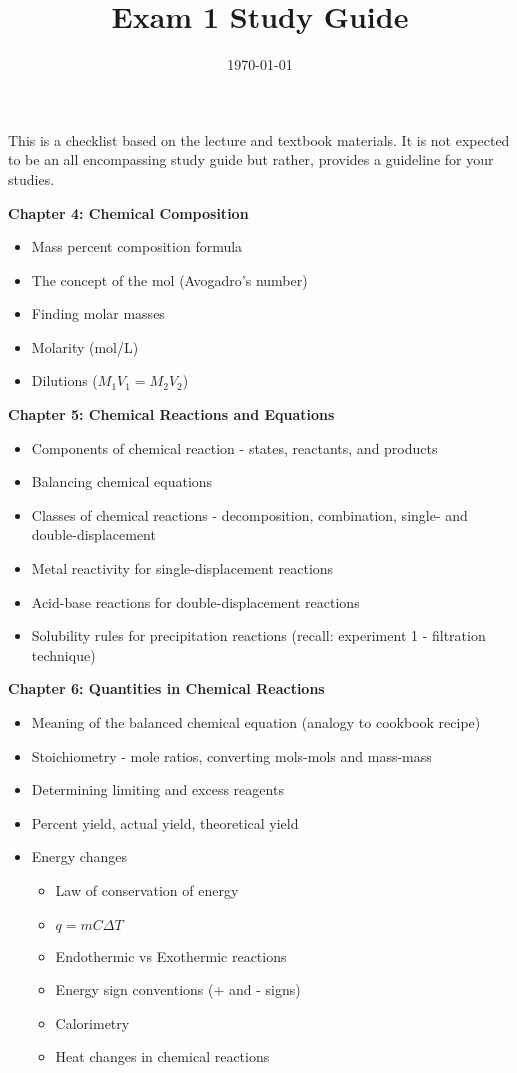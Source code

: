 \documentclass[12pt]{article}
\title{\textbf{Exam 1 Study Guide}}
\date{\today}
\begin{document}
\maketitle 

This is a checklist based on the lecture and textbook materials. It is not
expected to be an all encompassing study guide but rather, provides a guideline for
your studies.

\textbf{Chapter 4: Chemical Composition}

\begin{itemize}
  \setlength\itemsep{0em}
\item Mass percent composition formula
\item The concept of the mol (Avogadro's number)
\item Finding molar masses
\item Molarity (mol/L)
\item Dilutions ($M_1V_1 = M_2V_2$)
\end{itemize}

\textbf{Chapter 5: Chemical Reactions and Equations}

\begin{itemize}
  \setlength\itemsep{0em}
\item Components of chemical reaction - states, reactants, and
  products
\item Balancing chemical equations
\item Classes of chemical reactions - decomposition, combination,
  single- and double-displacement
\item Metal reactivity for single-displacement reactions
\item Acid-base reactions for double-displacement reactions
\item Solubility rules for precipitation reactions (recall: experiment 1
  - filtration technique)
\end{itemize}

\textbf{Chapter 6: Quantities in Chemical Reactions}

\begin{itemize}
  \setlength\itemsep{0em}
\item Meaning of the balanced chemical equation (analogy to cookbook
  recipe)
\item Stoichiometry - mole ratios, converting mols-mols and mass-mass
\item Determining limiting and excess reagents
\item Percent yield, actual yield, theoretical yield
\item Energy changes
  \begin{itemize}
  \item Law of conservation of energy
  \item $q = mC\Delta T$
  \item Endothermic vs Exothermic reactions
  \item Energy sign conventions (+ and - signs)
  \item Calorimetry
  \item Heat changes in chemical reactions
  \end{itemize}
\end{itemize}
\end{document}
